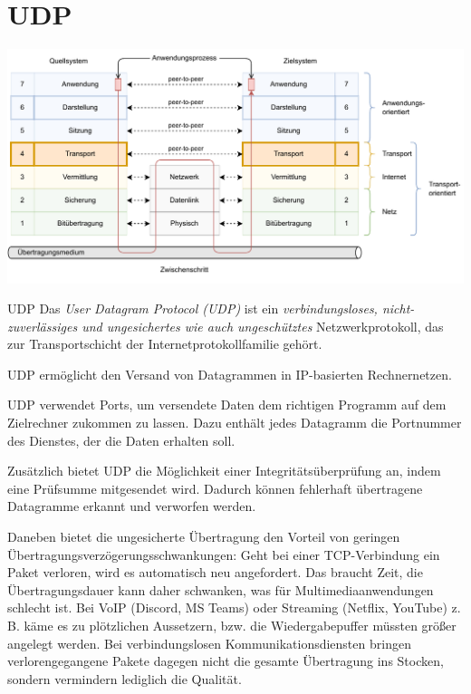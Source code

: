 \section{UDP}

\includegraphics[width=\textwidth]{includes/figures/defi_iso_osi_transport.pdf}

\begin{defi}{UDP}
    Das \emph{User Datagram Protocol (UDP)} ist ein \emph{verbindungsloses, nicht-zuverlässiges und ungesichertes wie auch ungeschütztes} Netzwerkprotokoll, das zur Transportschicht der Internetprotokollfamilie gehört.

    UDP ermöglicht den Versand von Datagrammen in IP-basierten Rechnernetzen.

    UDP verwendet Ports, um versendete Daten dem richtigen Programm auf dem Zielrechner zukommen zu lassen.
    Dazu enthält jedes Datagramm die Portnummer des Dienstes, der die Daten erhalten soll.

    Zusätzlich bietet UDP die Möglichkeit einer Integritätsüberprüfung an, indem eine Prüfsumme mitgesendet wird.
    Dadurch können fehlerhaft übertragene Datagramme erkannt und verworfen werden.

    Daneben bietet die ungesicherte Übertragung den Vorteil von geringen Übertragungsverzögerungsschwankungen: Geht bei einer TCP-Verbindung ein Paket verloren, wird es automatisch neu angefordert.
    Das braucht Zeit, die Übertragungsdauer kann daher schwanken, was für Multimediaanwendungen schlecht ist.
    Bei VoIP (Discord, MS Teams) oder Streaming (Netflix, YouTube) z. B. käme es zu plötzlichen Aussetzern, bzw. die Wiedergabepuffer müssten größer angelegt werden. Bei verbindungslosen Kommunikationsdiensten bringen verlorengegangene Pakete dagegen nicht die gesamte Übertragung ins Stocken, sondern vermindern lediglich die Qualität.
\end{defi}

